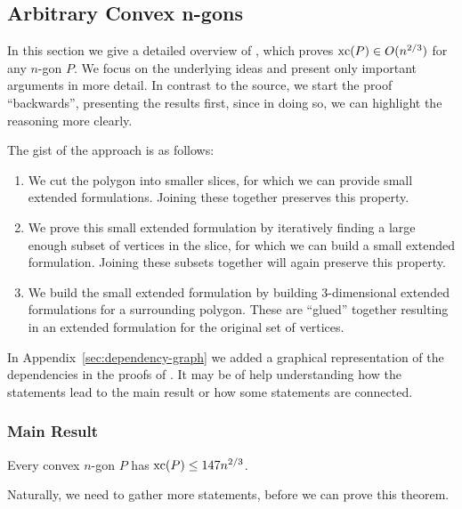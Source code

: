 \subsection{Arbitrary Convex n-gons}

In this section we give a detailed overview of \cite{shitov2020sublinear}, which proves $\operatorname{xc}(P) \in O(n^{2/3})$ for any $n$-gon $P$. 
We focus on the underlying ideas and present only important arguments in more detail. In contrast to the source, we start the proof ``backwards'', presenting  the results first, since in doing so, we can highlight the reasoning more clearly.

The gist of the approach is as follows: 
\begin{enumerate}
  \item We cut the polygon into smaller slices, for which we can provide small extended formulations. Joining these together preserves this property.
  \item We prove this small extended formulation by iteratively finding a large enough subset of vertices in the slice, for which we can build a small extended formulation. Joining these subsets together will again preserve this property.
  \item We build the small extended formulation by building 3-dimensional extended formulations for a surrounding polygon. These are ``glued'' together resulting in an extended formulation for the original set of vertices.
\end{enumerate}

In Appendix~\ref{sec:dependency-graph} we added a graphical representation of the dependencies in the proofs of \cite{shitov2014sublinear}. It may be of help understanding how the statements lead to the main result or how some statements are connected.



\subsubsection{Main Result}

\begin{theorem}\label{theorem:xc}
  Every convex $n$-gon $P$ has $\operatorname{xc}(P) \leq 147 n^{2/3}$.
\end{theorem}

Naturally, we need to gather more statements, before we can prove this theorem. 

